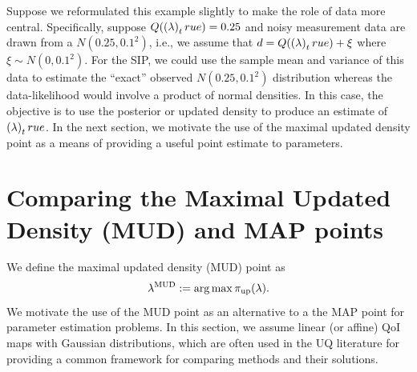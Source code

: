 Suppose we reformulated this example slightly to make the role of data more central.
Specifically, suppose $Q(\left ( \lambda \right )_true)=0.25$ and noisy measurement data are drawn from a $N(0.25,0.1^2)$, i.e., we assume that $d=Q(\left ( \lambda \right )_true)+\xi$ where $\xi\sim N(0,0.1^2)$.
For the SIP, we could use the sample mean and variance of this data to estimate the ``exact'' observed $N(0.25,0.1^2)$ distribution whereas the data-likelihood would involve a product of normal densities.
In this case, the objective is to use the posterior or updated density to produce an estimate of $\left ( \lambda \right )_true$.
In the next section, we motivate the use of the maximal updated density point as a means of providing a useful point estimate to parameters.







\section{Comparing the Maximal Updated Density (MUD) and MAP points}\label{sec:estimation}

We define the maximal updated density (MUD) point as
\begin{equation}\label{eq:mudpt_inital_defn}
	\lambda^{\text{MUD}} := \operatorname*{arg\,max} {\operatorname*{\pi_{up}}}(\lambda).
\end{equation}
We motivate the use of the MUD point as an alternative to a the MAP point for parameter estimation problems.
In this section, we assume linear (or affine) QoI maps with Gaussian distributions, which are often used in the UQ literature for providing a common framework for comparing methods and their solutions.

